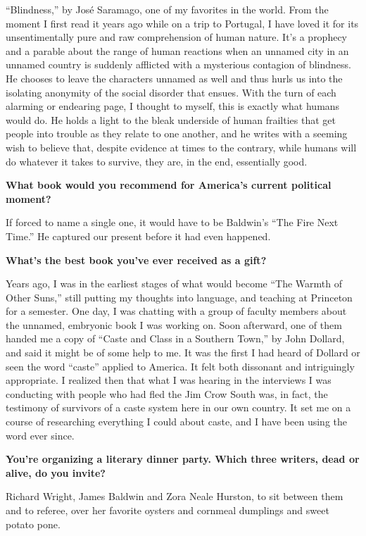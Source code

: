 ``Blindness,'' by José Saramago, one of my favorites in the world. From
the moment I first read it years ago while on a trip to Portugal, I have
loved it for its unsentimentally pure and raw comprehension of human
nature. It's a prophecy and a parable about the range of human reactions
when an unnamed city in an unnamed country is suddenly afflicted with a
mysterious contagion of blindness. He chooses to leave the characters
unnamed as well and thus hurls us into the isolating anonymity of the
social disorder that ensues. With the turn of each alarming or endearing
page, I thought to myself, this is exactly what humans would do. He
holds a light to the bleak underside of human frailties that get people
into trouble as they relate to one another, and he writes with a seeming
wish to believe that, despite evidence at times to the contrary, while
humans will do whatever it takes to survive, they are, in the end,
essentially good.

\textbf{What book would you recommend for America's current political
moment?}

If forced to name a single one, it would have to be Baldwin's ``The Fire
Next Time.'' He captured our present before it had even happened.

\textbf{What's the best book you've ever received as a gift?}

Years ago, I was in the earliest stages of what would become ``The
Warmth of Other Suns,'' still putting my thoughts into language, and
teaching at Princeton for a semester. One day, I was chatting with a
group of faculty members about the unnamed, embryonic book I was working
on. Soon afterward, one of them handed me a copy of ``Caste and Class in
a Southern Town,'' by John Dollard, and said it might be of some help to
me. It was the first I had heard of Dollard or seen the word ``caste''
applied to America. It felt both dissonant and intriguingly appropriate.
I realized then that what I was hearing in the interviews I was
conducting with people who had fled the Jim Crow South was, in fact, the
testimony of survivors of a caste system here in our own country. It set
me on a course of researching everything I could about caste, and I have
been using the word ever since.

\textbf{You're organizing a literary dinner party. Which three writers,
dead or alive, do you invite?}

Richard Wright, James Baldwin and Zora Neale Hurston, to sit between
them and to referee, over her favorite oysters and cornmeal dumplings
and sweet potato pone.

